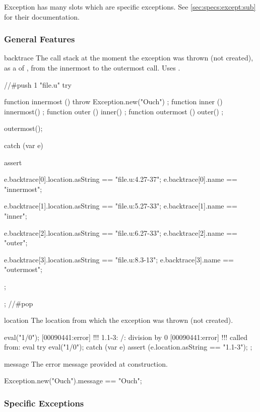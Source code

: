 Exception has many slots which are specific exceptions.  See
\autoref{sec:specs:except:sub} for their documentation.

\subsubsection{General Features}
\begin{urbiscriptapi}
\item[backtrace] The call stack at the moment the exception was thrown (not
  created), as a  of ,
  from the innermost to the outermost call.  Uses
  .
\begin{urbiscript}
//#push 1 "file.u"
try
{
  function innermost () { throw Exception.new("Ouch") };
  function inner     () { innermost() };
  function outer     () { inner() };
  function outermost () { outer() };

  outermost();
}
catch (var e)
{
  assert
  {
    e.backtrace[0].location.asString == "file.u:4.27-37";
    e.backtrace[0].name == "innermost";

    e.backtrace[1].location.asString == "file.u:5.27-33";
    e.backtrace[1].name == "inner";

    e.backtrace[2].location.asString == "file.u:6.27-33";
    e.backtrace[2].name == "outer";

    e.backtrace[3].location.asString == "file.u:8.3-13";
    e.backtrace[3].name == "outermost";
  };
};
//#pop
\end{urbiscript}


\item[location] The location from which the exception was thrown (not
  created).
\begin{urbiscript}
eval("1/0");
[00090441:error] !!! 1.1-3: /: division by 0
[00090441:error] !!!    called from: eval
try
{
  eval("1/0");
}
catch (var e)
{
  assert (e.location.asString == "1.1-3");
};
\end{urbiscript}


\item[message] The error message provided at construction.
\begin{urbiassert}
Exception.new("Ouch").message == "Ouch";
\end{urbiassert}
\end{urbiscriptapi}

\subsubsection{Specific Exceptions}
\label{sec:specs:except:sub}

